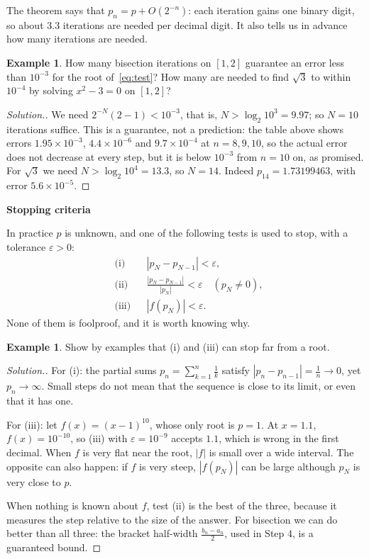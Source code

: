 \documentclass[11pt,a4paper]{article}
\numberwithin{equation}{section}
\theoremstyle{definition}
\newtheorem{exa}[thm]{Example}
\newenvironment{solution}
  {\renewcommand{\qedsymbol}{}\begin{proof}[\textit{Solution}.]}
  {\end{proof}}
\newcommand{\subhead}[1]{%
  \par\medskip\noindent\textbf{#1}\par\nobreak\smallskip}
\begin{document}
The theorem says that $p_n = p+O(2^{-n})$: each iteration gains one binary digit, so about $3.3$ iterations are needed per decimal digit.
It also tells us in advance how many iterations are needed.

\begin{exa}
How many bisection iterations on $[1,2]$ guarantee an error less than $10^{-3}$ for the root of~\eqref{eq:test}? How many are needed to
find $\sqrt3$ to within $10^{-4}$ by solving $x^2-3 = 0$ on $[1,2]$?
\end{exa}

\begin{solution}
We need $2^{-N}(2-1)<10^{-3}$, that is, $N>\log_2 10^3 = 9.97$; so $N = 10$ iterations suffice. This is a guarantee, not a prediction: the table above shows errors
$1.95\times10^{-3}$, $4.4\times10^{-6}$ and $9.7\times10^{-4}$ at $n = 8, 9, 10$, so the actual error does not decrease at every step, but it is
below $10^{-3}$ from $n = 10$ on, as promised.
For $\sqrt3$ we need $N>\log_2 10^4 = 13.3$, so $N = 14$. Indeed $p_{14} = 1.73199463$, with error $5.6\times10^{-5}$.
\end{solution}

\subhead{Stopping criteria}
In practice $p$ is unknown, and one of the following tests is used to stop, with a tolerance $\varepsilon>0$:
\begin{align*}
&\text{(i)} && |p_N-p_{N-1}|<\varepsilon,\\
&\text{(ii)} && \frac{|p_N-p_{N-1}|}{|p_N|}<\varepsilon\quad (p_N\neq0),\\
&\text{(iii)} && |f(p_N)|<\varepsilon .
\end{align*}
None of them is foolproof, and it is worth knowing why.

\begin{exa}
Show by examples that (i) and (iii) can stop far from a root.
\end{exa}

\begin{solution}
For (i): the partial sums $p_n = \sum_{k=1}^n\frac1k$ satisfy $|p_n-p_{n-1}| = \frac1n\longrightarrow0$, yet $p_n\longrightarrow\infty$. Small
steps do not mean that the sequence is close to its limit, or even that it has one.

For (iii): let $f(x) = (x-1)^{10}$, whose only root is $p = 1$. At $x = 1.1$, $f(x) = 10^{-10}$, so (iii) with $\varepsilon = 10^{-9}$
accepts $1.1$, which is wrong in the first decimal. When $f$ is very flat near the root, $|f|$ is small over a wide interval. The opposite
can also happen: if $f$ is very steep, $|f(p_N)|$ can be large although $p_N$ is very close to $p$.

When nothing is known about $f$, test (ii) is the best of the three, because it measures the step relative to the size of the answer.
For bisection we can do better than all three: the bracket half-width $\frac{b_n-a_n}{2}$, used in Step 4, is a guaranteed bound.
\end{solution}
\end{document}
